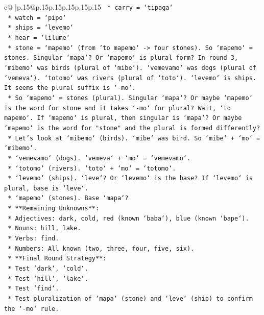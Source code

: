 \documentclass{article}
\begin{document}
{\begin{supertabular}{c@{$\;$}|p{.15\linewidth}@{}p{.15\linewidth}p{.15\linewidth}p{.15\linewidth}p{.15\linewidth}p{.15\linewidth}}
{{{\texttt{        *   carry = `tipaga`} \\
\texttt{        *   watch = `pipo`} \\
\texttt{        *   ships = `levemo`} \\
\texttt{        *   hear = `lilume`} \\
\texttt{        *   stone = `mapemo` (from `to mapemo` {-}> four stones). So `mapemo` = stones. Singular `mapa`? Or `mapemo` is plural form? In round 3, `mibemo` was birds (plural of `mibe`). `vemevamo` was dogs (plural of `vemeva`). `totomo` was rivers (plural of `toto`). `levemo` is ships. It seems the plural suffix is `{-}mo`.} \\
\texttt{        *   So `mapemo` = stones (plural). Singular `mapa`? Or maybe `mapemo` is the word for stone and it takes `{-}mo` for plural? Wait, `to mapemo`. If `mapemo` is plural, then singular is `mapa`? Or maybe `mapemo` is the word for "stone" and the plural is formed differently?} \\
\texttt{        *   Let's look at `mibemo` (birds). `mibe` was bird. So `mibe` + `mo` = `mibemo`.} \\
\texttt{        *   `vemevamo` (dogs). `vemeva` + `mo` = `vemevamo`.} \\
\texttt{        *   `totomo` (rivers). `toto` + `mo` = `totomo`.} \\
\texttt{        *   `levemo` (ships). `leve`? Or `levemo` is the base? If `levemo` is plural, base is `leve`.} \\
\texttt{        *   `mapemo` (stones). Base `mapa`?} \\
\texttt{    *   **Remaining Unknowns**:} \\
\texttt{        *   Adjectives: dark, cold, red (known `baba`), blue (known `bape`).} \\
\texttt{        *   Nouns: hill, lake.} \\
\texttt{        *   Verbs: find.} \\
\texttt{        *   Numbers: All known (two, three, four, five, six).} \\
\texttt{    *   **Final Round Strategy**:} \\
\texttt{        *   Test `dark`, `cold`.} \\
\texttt{        *   Test `hill`, `lake`.} \\
\texttt{        *   Test `find`.} \\
\texttt{        *   Test pluralization of `mapa` (stone) and `leve` (ship) to confirm the `{-}mo` rule.} \\
}}}
\end{supertabular}}
\end{document}
